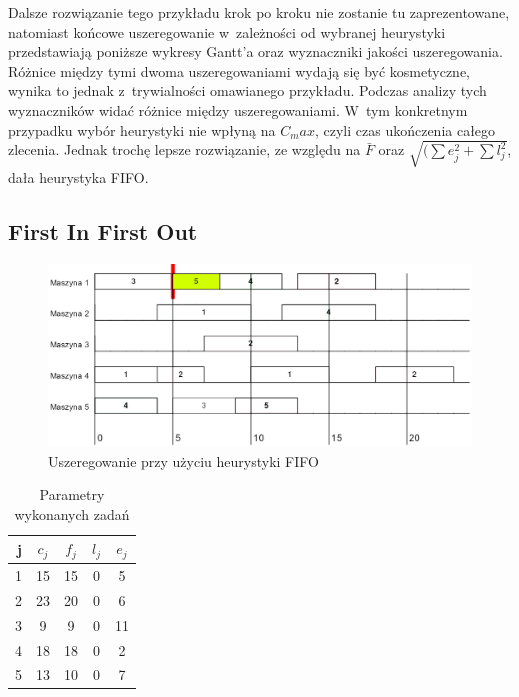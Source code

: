 \documentclass[twoside]{kInzynierka}
\begin{document}
Dalsze rozwiązanie tego przykładu krok po kroku nie zostanie tu zaprezentowane, natomiast końcowe uszeregowanie w~zależności od wybranej heurystyki przedstawiają poniższe wykresy Gantt'a oraz wyznaczniki jakości uszeregowania. Różnice między tymi dwoma uszeregowaniami wydają się być kosmetyczne, wynika to jednak z~trywialności omawianego przykładu. Podczas analizy tych wyznaczników widać różnice między uszeregowaniami. W~tym konkretnym przypadku wybór heurystyki nie wpłyną na \(C_max\), czyli czas ukończenia całego zlecenia. Jednak trochę lepsze rozwiązanie, ze względu na \(\bar{F}\) oraz \(\sqrt{(\sum e_j^2 + \sum l_j^2}\), dała heurystyka FIFO.

\FloatBarrier
\newpage
\subsection{First In First Out}

\begin{figure}[htb]
    \centering
    \includegraphics[width=\textwidth, keepaspectratio=true]{./obrazki/fifo}
    \caption{Uszeregowanie przy użyciu heurystyki FIFO}
\end{figure}

\begin{table}[htb]
	\centering
	\caption{Parametry wykonanych zadań}
	\begin{tabular}{ | r | c | c | c | c |}
	\hline
	j	& \(c_j\)	& \(f_j\)	& \(l_j\)	& \(e_j\)	\\ \hline
	1	& 15	& 15	& 0	& 5	\\ \hline
	2	& 23	& 20	& 0	& 6	\\ \hline
	3	& 9	& 9	& 0	& 11	\\ \hline
	4	& 18	& 18	& 0	& 2	\\ \hline
	5	& 13	& 10	& 0	& 7	\\ \hline
	\end{tabular}
\end{table}
\end{document}
